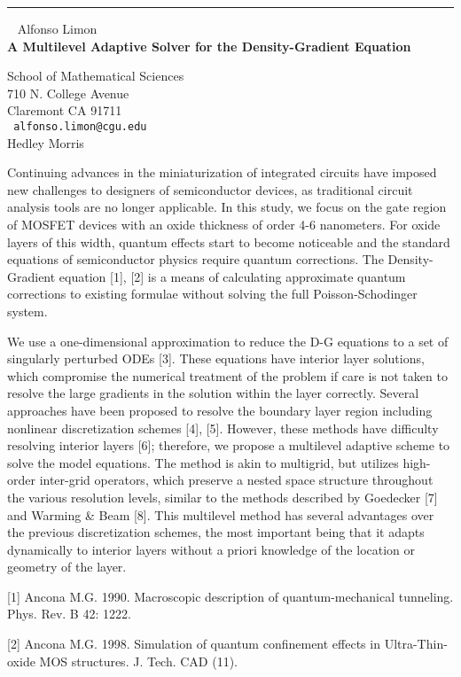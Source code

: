 \documentclass{report}
\begin{document}
\begin{center}

\rule{6in}{1pt} \
{\large
Alfonso Limon
\\ {\bf
A Multilevel Adaptive Solver for the Density-Gradient Equation
}}

School of Mathematical Sciences
\\
710 N. College Avenue
\\
Claremont CA 91711
\\ {\tt
alfonso.limon@cgu.edu
}
\\
Hedley Morris
\end{center}

Continuing advances in the miniaturization of integrated circuits have
imposed new challenges to designers of semiconductor devices, as
traditional circuit analysis tools are no longer applicable. In this
study, we focus on the gate region of MOSFET devices with an oxide
thickness of order 4-6 nanometers. For oxide layers of this width,
quantum effects start to become noticeable and the standard equations
of semiconductor physics require quantum corrections. The
Density-Gradient equation [1], [2] is a means of calculating
approximate quantum corrections to existing formulae without solving
the full Poisson-Schodinger system.

We use a one-dimensional
approximation to reduce the D-G equations to a set of singularly
perturbed ODEs [3]. These equations have interior layer solutions,
which compromise the numerical treatment of the problem if care is not
taken to resolve the large gradients in the solution within the layer
correctly. Several approaches have been proposed to resolve the
boundary layer region including nonlinear discretization schemes [4],
[5]. However, these methods have difficulty resolving interior layers
[6]; therefore, we propose a multilevel adaptive scheme to solve the
model equations. The method is akin to multigrid, but utilizes
high-order inter-grid operators, which preserve a nested space
structure throughout the various resolution levels, similar to the
methods described by Goedecker [7] and Warming \& Beam [8]. This
multilevel method has several advantages over the previous
discretization schemes, the most important being that it adapts
dynamically to interior layers without a priori knowledge of the
location or geometry of the layer.

[1] Ancona M.G. 1990. Macroscopic description of quantum-mechanical
tunneling. Phys. Rev. B 42: 1222.

[2] Ancona M.G. 1998. Simulation of quantum confinement effects in
Ultra-Thin-oxide MOS structures. J. Tech. CAD (11).
\end{document}
